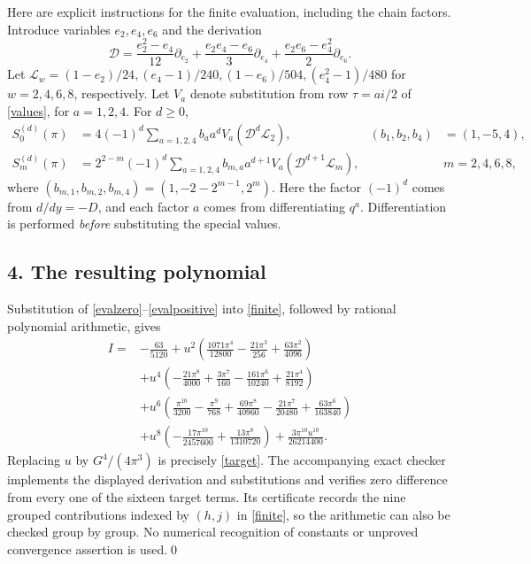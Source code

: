 \documentclass[11pt]{article}
\begin{document}
Here are explicit instructions for the finite evaluation, including
the chain factors. Introduce variables $e_2,e_4,e_6$ and the derivation
\[
 \mathcal D=\frac{e_2^2-e_4}{12}\partial_{e_2}
       +\frac{e_2e_4-e_6}{3}\partial_{e_4}
       +\frac{e_2e_6-e_4^2}{2}\partial_{e_6}.
\]
Let $\mathcal L_w=(1-e_2)/24,(e_4-1)/240,(1-e_6)/504,
(e_4^2-1)/480$ for $w=2,4,6,8$, respectively. Let $V_a$ denote
substitution from row $\tau=ai/2$ of \eqref{values}, for $a=1,2,4$.
For $d\ge0$,
\begin{align}
 S_0^{(d)}(\pi)
   &=4(-1)^d\sum_{a=1,2,4} b_a a^d
                         V_a(\mathcal D^d\mathcal L_2),
       &(b_1,b_2,b_4)&=(1,-5,4),\label{evalzero}\\
 S_m^{(d)}(\pi)
   &=2^{2-m}(-1)^d\sum_{a=1,2,4} b_{m,a}a^{d+1}
                         V_a(\mathcal D^{d+1}\mathcal L_m),
       &&m=2,4,6,8,\label{evalpositive}
\end{align}
where $(b_{m,1},b_{m,2},b_{m,4})=(1,-2-2^{m-1},2^m)$.
Here the factor $(-1)^d$ comes from $d/dy=-D$, and each factor
$a$ comes from differentiating $q^a$. Differentiation is performed
\emph{before} substituting the special values.

\subsection*{4. The resulting polynomial}
Substitution of \eqref{evalzero}--\eqref{evalpositive} into
\eqref{finite}, followed by rational polynomial arithmetic, gives
\begin{align*}
 I={}&-\frac{63}{5120}
 +u^2\left(\frac{1071\pi^4}{12800}-\frac{21\pi^3}{256}
                                      +\frac{63\pi^2}{4096}\right)\\
 &+u^4\left(-\frac{21\pi^8}{4000}+\frac{3\pi^7}{160}
                   -\frac{161\pi^6}{10240}+\frac{21\pi^4}{8192}\right)\\
 &+u^6\left(\frac{\pi^{10}}{3200}-\frac{\pi^9}{768}
       +\frac{69\pi^8}{40960}-\frac{21\pi^7}{20480}
       +\frac{63\pi^6}{163840}\right)\\
 &+u^8\left(-\frac{17\pi^{10}}{2457600}
                         +\frac{13\pi^8}{1310720}\right)
 +\frac{3\pi^{10}u^{10}}{26214400}.
\end{align*}
Replacing $u$ by $G^4/(4\pi^3)$ is precisely \eqref{target}.
The accompanying exact checker implements the displayed derivation
and substitutions and verifies zero difference from every one of the
sixteen target terms. Its certificate records the nine grouped
contributions indexed by $(h,j)$ in \eqref{finite}, so the arithmetic
can also be checked group by group. No numerical recognition of
constants or unproved convergence assertion is used.\qed
\end{document}
